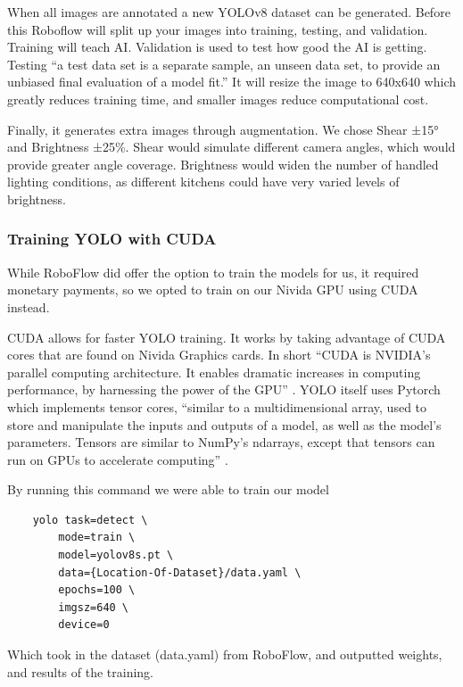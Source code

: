 \documentclass{article}
\begin{document}
When all images are annotated a new YOLOv8 dataset can be generated. Before this Roboflow will split up your images into training, testing, and validation. Training will teach AI. Validation is used to test how good the AI is getting. Testing “a test data set is a separate sample, an unseen data set, to provide an unbiased final evaluation of a model fit.” \cite{trainvalidtest} It will resize the image to 640x640 which greatly reduces training time, and smaller images reduce computational cost.

Finally, it generates extra images through augmentation. We chose Shear ±15° and Brightness ±25\%. Shear would simulate different camera angles, which would provide greater angle coverage. Brightness would widen the number of handled lighting conditions, as different kitchens could have very varied levels of brightness.

\subsubsection{Training YOLO with CUDA}
While RoboFlow did offer the option to train the models for us, it required monetary payments, so we opted to train on our Nivida GPU using CUDA \cite{cudacuda} instead.

CUDA allows for faster YOLO training. It works by taking advantage of CUDA cores that are found on Nivida Graphics cards. In short “CUDA is NVIDIA’s parallel computing architecture. It enables dramatic increases in computing performance, by harnessing the power of the GPU” \cite{ghorpade2012gpgpu}. YOLO itself uses Pytorch \cite{nvidiapytorch} which implements tensor cores, “similar to a multidimensional array, used to store and manipulate the inputs and outputs of a model, as well as the model’s parameters. Tensors are similar to NumPy’s ndarrays, except that tensors can run on GPUs to accelerate computing” \cite{nvidiapytorch}.

By running this command we were able to train our model
\begin{verbatim}
    yolo task=detect \
        mode=train \
        model=yolov8s.pt \
        data={Location-Of-Dataset}/data.yaml \
        epochs=100 \
        imgsz=640 \
        device=0
    \end{verbatim}


Which took in the dataset (data.yaml) from RoboFlow, and outputted weights, and results of the training.
\end{document}
